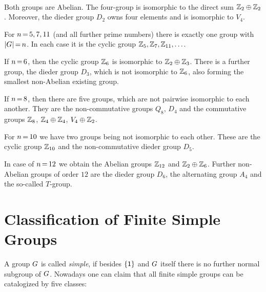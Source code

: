 \documentclass[11pt,twoside]{article}
\begin{document}
\paragraph{}
Both groups are Abelian.
The four-group is isomorphic to the direct sum ${\mathbb{Z}}_2 \oplus {\mathbb{Z}}_2$.
Moreover,
the dieder group $D_2$ owns four elements and is isomorphic to $V_4$.

\vspace{1mm}

For $n {\,=\,} 5,7,11$ (and all further prime numbers)
there is exactly one group with $\abs{\grpG} \eq n$.
In each case it is the cyclic group ${\mathbb{Z}}_5, {\mathbb{Z}}_7, {\mathbb{Z}}_{11}, \ldots$.

\vspace{1mm}

If $n {\,=\,} 6$,
then the cyclic group ${\mathbb{Z}}_6$ is isomorphic to ${\mathbb{Z}}_2 \oplus {\mathbb{Z}}_3$.
There is a further group,
the dieder group $D_3$,
which is not isomorphic to ${\mathbb{Z}}_6$,
also forming the smallest non-Abelian existing group.

\vspace{1mm}

If $n {\,=\,} 8$,
then there are five groups,
which are not pairwise isomorphic to each another.
They are the non-commutative groups $Q_8$, $D_4$ and the commutative groups
${\mathbb{Z}}_8$, ${\mathbb{Z}}_4 \oplus {\mathbb{Z}}_4$, $V_4 \oplus {\mathbb{Z}}_2$.

\vspace{1mm}

For $n {\,=\,} 10$ we have two groups being not isomorphic to each other.
These are the cyclic group ${\mathbb{Z}}_{10}$
and the non-commutative dieder group $D_5$.

\vspace{1mm}

In case of $n {\,=\,} 12$ we obtain the Abelian groups
${\mathbb{Z}}_{12}$ and ${\mathbb{Z}}_2 \oplus {\mathbb{Z}}_6$.
Further non-Abelian groups of order $12$ are the dieder group $D_6$,
the alternating group $A_4$ and the so-called $T$-group.

\section{Classification of Finite Simple Groups}
A group $G$ is called \textit{simple},
if besides $\{ {\mathsf{1}} \}$ and $G$ itself
there is no further normal subgroup of $G$.
Nowadays one can claim that all finite simple groups can be catalogized
by five classes:
\end{document}
